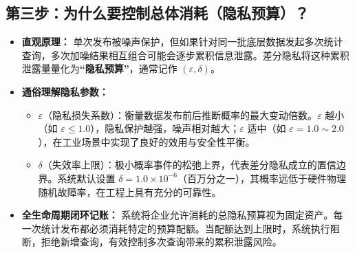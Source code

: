 \subsection{第三步：为什么要控制总体消耗（隐私预算）？}
\begin{itemize}[leftmargin=2em]
  \item \textbf{直观原理：} 单次发布被噪声保护，但如果针对同一批底层数据发起多次统计查询，多次加噪结果相互组合可能会逐步累积信息泄露。差分隐私将这种累积泄露量量化为\textbf{“隐私预算”}，通常记作 $(\varepsilon, \delta)$。
  \item \textbf{通俗理解隐私参数：}
  \begin{itemize}
    \item $\varepsilon$（隐私损失系数）：衡量数据发布前后推断概率的最大变动倍数。$\varepsilon$ 越小（如 $\varepsilon \le 1.0$），隐私保护越强，噪声相对越大；$\varepsilon$ 适中（如 $\varepsilon = 1.0 \sim 2.0$），在工业场景中实现了良好的效用与安全性平衡。
    \item $\delta$（失效率上限）：极小概率事件的松弛上界，代表差分隐私成立的置信边界。系统默认设置 $\delta = 1.0 \times 10^{-6}$（百万分之一），其概率远低于硬件物理随机故障率，在工程上具有充分的可靠性。
  \end{itemize}
  \item \textbf{全生命周期闭环记账：} 系统将企业允许消耗的总隐私预算视为固定资产。每一次统计发布都必须消耗特定的预算配额。当配额达到上限时，系统执行阻断，拒绝新增查询，有效控制多次查询带来的累积泄露风险。
\end{itemize}
